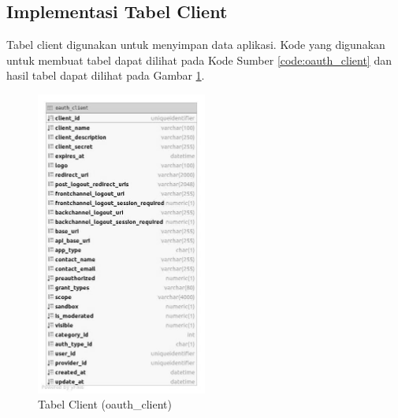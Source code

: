 \subsection{Implementasi Tabel Client}
\par Tabel client digunakan untuk menyimpan data aplikasi. Kode yang digunakan untuk membuat tabel dapat dilihat pada Kode Sumber \ref{code:oauth_client} dan hasil tabel dapat dilihat pada Gambar \ref{tabel_oauth_client}.

\begin{figure}[H]
	\caption{Tabel Client (oauth\_client)}
	\label{tabel_oauth_client}
    \centering\includegraphics[width=0.5\textwidth]{bab4/figures/tabel_oauth_client.jpg}
\end{figure}

